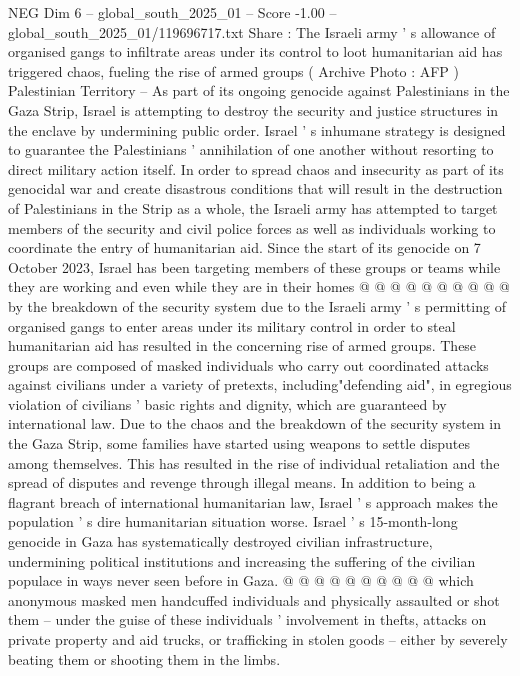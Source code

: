 \begin{textsample}{NEG Dim 6 – global\_south\_2025\_01 – Score -1.00 – global\_south\_2025\_01/119696717.txt}  \label{ex:f6_neg_011}
Share : The Israeli army ' s allowance of organised gangs to infiltrate areas under its control to loot humanitarian aid has triggered chaos, fueling the rise of armed groups ( Archive Photo : AFP ) Palestinian Territory -- As part of its ongoing genocide against Palestinians in the Gaza Strip, Israel is attempting to destroy the security and justice structures in the enclave by undermining public order.
Israel ' s inhumane strategy is designed to guarantee the Palestinians ' annihilation of one another without resorting to direct military action itself.
In order to spread chaos and insecurity as part of its genocidal war and create disastrous conditions that will result in the destruction of Palestinians in the Strip as a whole, the Israeli army has attempted to target members of the security and civil police forces as well as individuals working to coordinate the entry of humanitarian aid.
Since the start of its genocide on 7 October 2023, Israel has been targeting members of these groups or teams while they are working and even while they are in their homes @ @ @ @ @ @ @ @ @ @ by the breakdown of the security system due to the Israeli army ' s permitting of organised gangs to enter areas under its military control in order to steal humanitarian aid has resulted in the concerning rise of armed groups.
These groups are composed of masked individuals who carry out coordinated attacks against civilians under a variety of pretexts, including"defending aid", in egregious violation of civilians ' basic rights and dignity, which are guaranteed by international law.
Due to the chaos and the breakdown of the security system in the Gaza Strip, some families have started using weapons to settle disputes among themselves.
This has resulted in the rise of individual retaliation and the spread of disputes and revenge through illegal means.
In addition to being a flagrant breach of international humanitarian law, Israel ' s approach makes the population ' s dire humanitarian situation worse.
Israel ' s 15-month-long genocide in Gaza has systematically destroyed civilian infrastructure, undermining political institutions and increasing the suffering of the civilian populace in ways never seen before in Gaza. @ @ @ @ @ @ @ @ @ @ which anonymous masked men handcuffed individuals and physically assaulted or shot them -- under the guise of these individuals ' involvement in thefts, attacks on private property and aid trucks, or trafficking in stolen goods -- either by severely beating them or shooting them in the limbs.

\end{textsample}
